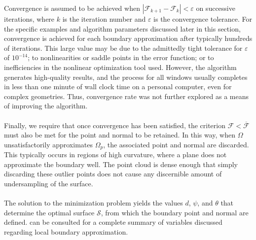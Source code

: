 %
Convergence is assumed to be achieved when $\left| \mathcal{F}_{k+1} - \mathcal{F}_{k}\right| < \varepsilon$ on successive iterations, where $k$ is the iteration number and  $\varepsilon$ is the convergence tolerance. For the specific examples and algorithm parameters discussed later in this section, convergence is achieved for each boundary approximation after typically hundreds of iterations. This large value may be due to the admittedly tight tolerance for $\varepsilon$ of $10^{-14}$; to nonlinearities or saddle points in the error function; or to inefficiencies in the nonlinear optimization tool used. However, the algorithm generates high-quality results, and the process for all windows usually completes in less than one minute of wall clock time on a personal computer, even for complex geometries. Thus, convergence rate was not further explored as a means of improving the algorithm. \\ \\
%
Finally, we require that once convergence has been satisfied, the criterion $\mathcal{F} < \overline{\mathcal{F}}$ must also be met for the point and normal to be retained. In this way, when $\Omega$ unsatisfactorily approximates $\Omega_p$, the associated point and normal are discarded. This typically occurs in regions of high curvature, where a plane does not approximate the boundary well. The point cloud is dense enough that simply discarding these outlier points does not cause any discernible amount of undersampling of the surface. \\ \\
%
The solution to the minimization problem yields the values $d$, $\psi$, and $\theta$ that determine the optimal surface $\mathcal{S}$, from which the boundary point and normal are defined.  can be consulted for a complete summary of variables discussed regarding local boundary approximation. \\

